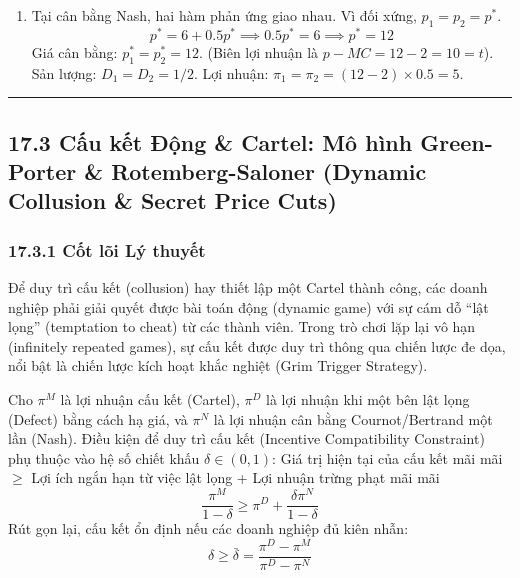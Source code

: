 \documentclass[
]{article}
\providecommand{\tightlist}{%
  \setlength{\itemsep}{0pt}\setlength{\parskip}{0pt}}
\begin{document}
\begin{enumerate}
\def\labelenumi{\alph{enumi})}
\setcounter{enumi}{1}
\tightlist
\item
  Tại cân bằng Nash, hai hàm phản ứng giao nhau. Vì đối xứng,
  \(p_1 = p_2 = p^*\).
  \[ p^* = 6 + 0.5p^* \implies 0.5p^* = 6 \implies p^* = 12 \] Giá cân
  bằng: \(p_1^* = p_2^* = 12\). (Biên lợi nhuận là
  \(p - MC = 12 - 2 = 10 = t\)). Sản lượng: \(D_1 = D_2 = 1/2\). Lợi
  nhuận: \(\pi_1 = \pi_2 = (12 - 2) \times 0.5 = 5\).
\end{enumerate}

\begin{center}\rule{0.5\linewidth}{0.5pt}\end{center}

\subsection{17.3 Cấu kết Động \& Cartel: Mô hình Green-Porter \&
Rotemberg-Saloner (Dynamic Collusion \& Secret Price
Cuts)}\label{cux1ea5u-kux1ebft-ux111ux1ed9ng-cartel-muxf4-huxecnh-green-porter-rotemberg-saloner-dynamic-collusion-secret-price-cuts}

\subsubsection{17.3.1 Cốt lõi Lý
thuyết}\label{cux1ed1t-luxf5i-luxfd-thuyux1ebft-2}

Để duy trì cấu kết (collusion) hay thiết lập một Cartel thành công, các
doanh nghiệp phải giải quyết được bài toán động (dynamic game) với sự
cám dỗ ``lật lọng'' (temptation to cheat) từ các thành viên. Trong trò
chơi lặp lại vô hạn (infinitely repeated games), sự cấu kết được duy trì
thông qua chiến lược đe dọa, nổi bật là chiến lược kích hoạt khắc nghiệt
(Grim Trigger Strategy).

Cho \(\pi^M\) là lợi nhuận cấu kết (Cartel), \(\pi^D\) là lợi nhuận khi
một bên lật lọng (Defect) bằng cách hạ giá, và \(\pi^N\) là lợi nhuận
cân bằng Cournot/Bertrand một lần (Nash). Điều kiện để duy trì cấu kết
(Incentive Compatibility Constraint) phụ thuộc vào hệ số chiết khấu
\(\delta \in (0,1)\): Giá trị hiện tại của cấu kết mãi mãi \(\ge\) Lợi
ích ngắn hạn từ việc lật lọng + Lợi nhuận trừng phạt mãi mãi
\[ \frac{\pi^M}{1 - \delta} \ge \pi^D + \frac{\delta \pi^N}{1 - \delta} \]
Rút gọn lại, cấu kết ổn định nếu các doanh nghiệp đủ kiên nhẫn:
\[ \delta \ge \bar{\delta} = \frac{\pi^D - \pi^M}{\pi^D - \pi^N} \]
\end{document}
